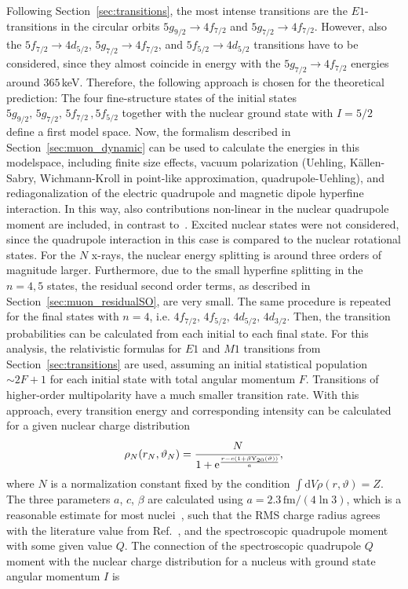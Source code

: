 Following Section~\ref{sec:transitions}, the most intense transitions are the $E1$-transitions in the circular orbits $5g_{9/2}\rightarrow4f_{7/2}$ and $5g_{7/2}\rightarrow4f_{7/2}$. However, also the $5f_{7/2}\rightarrow4d_{5/2}$, $5g_{7/2}\rightarrow 4f_{7/2}$, and $5f_{5/2}\rightarrow 4d_{5/2}$ transitions have to be considered, since they almost coincide in energy with the $5g_{7/2}\rightarrow4f_{7/2}$ energies around $365\,$keV. Therefore, the following approach is chosen for the theoretical prediction: The four fine-structure states of the initial states $5g_{9/2},\,5g_{7/2},\,5f_{7/2}\,,5f_{5/2}$ together with the nuclear ground state with $I=5/2$ define a first model space. Now, the formalism described in Section~\ref{sec:muon_dynamic} can be used to calculate the energies in this modelspace, including finite size effects, vacuum polarization (Uehling, Källen-Sabry, Wichmann-Kroll in point-like approximation, quadrupole-Uehling), and rediagonalization of the electric quadrupole and magnetic dipole hyperfine interaction. In this way, also contributions non-linear in the nuclear quadrupole moment are included, in contrast to~\cite{konijn1979}.
Excited nuclear states were not considered, since the quadrupole interaction in this case is compared to the nuclear rotational states. For the $N$ x-rays, the nuclear energy splitting is around three orders of magnitude larger. Furthermore, due to the small hyperfine splitting in the ${n}{=}{4,5}$ states, the residual second order terms, as described in Section~\ref{sec:muon_residualSO}, are very small.
The same procedure is repeated for the final states with ${n}{=}{4}$, i.e. $4f_{7/2},\,4f_{5/2},\,4d_{5/2},\,4d_{3/2}$.
Then, the transition probabilities can be calculated from each initial to each final state. For this analysis, the relativistic formulas for $E1$ and $M1$ transitions from Section~\ref{sec:transitions} are used, assuming an initial statistical population $\sim 2F+1$ for each initial state with total angular momentum $F$. Transitions of higher-order multipolarity have a much smaller transition rate. With this approach, every transition energy and corresponding intensity can be calculated for a given nuclear charge distribution
\begin{equation}
\rho_N(r_N,\vartheta_N)=\cfrac{N}{1+\text{e}^{\frac{r-c(1+\beta \text{Y}_{20}(\vartheta))}{a}}},
\end{equation}
where $N$ is a normalization constant fixed by the condition $\int\text{d}V \rho(r,\vartheta) = Z$.
The three parameters $a$, $c$, $\beta$ are calculated using $a=2.3\,\text{fm}/(4\ln3)$, which is a reasonable estimate for most nuclei~\cite{Beier2000}, such that the RMS charge radius agrees with the literature value from Ref.~\cite{Angeli2013}, and the spectroscopic quadrupole moment with some given value $Q$. The connection of the spectroscopic quadrupole $Q$ moment with the nuclear charge distribution for a nucleus with ground state angular momentum $I$ is
